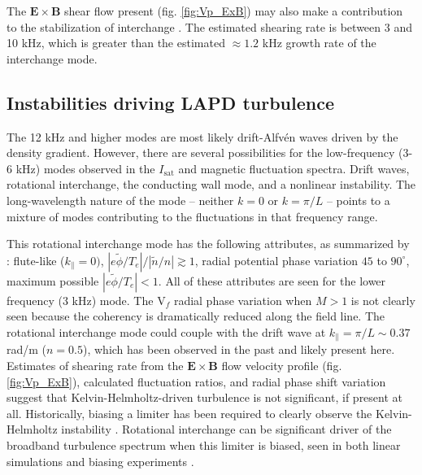 The $\boldsymbol{E \times B}$ shear flow present (fig. \ref{fig:Vp_ExB}) may also make a contribution to the stabilization of interchange \cite{Ryutov_2011,Bagryansky_2003,Bagryansky_2007,Beklemishev_2010}. The estimated shearing rate is between 3 and 10 kHz, which is greater than the estimated $\approx 1.2$ kHz growth rate of the interchange mode.

\subsection{Instabilities driving LAPD turbulence}


The 12 kHz and higher modes are most likely drift-Alfv\'en waves driven by the density gradient. However, there are several possibilities for the low-frequency (3-6 kHz) modes observed in the $I_\text{sat}$ and magnetic fluctuation spectra. Drift waves, rotational interchange, the conducting wall mode, and a nonlinear instability. The long-wavelength nature of the mode -- neither $k=0$ or $k=\pi/L$ -- points to a mixture of modes contributing to the fluctuations in that frequency range.

This rotational interchange mode has the following attributes, as summarized by \cite{Jassby_transverse_1972}: flute-like ($k_\parallel=0)$, $|e\tilde{\phi}/T_e|/|\tilde{n}/n| \gtrsim 1$, radial potential phase variation $45$ to $90^\circ$, maximum possible $|e\tilde{\phi}/T_e| < 1$. All of these attributes are seen for the lower frequency (3 kHz) mode. The V$_f$ radial phase variation when $M>1$ is not clearly seen because the coherency is dramatically reduced along the field line.
The rotational interchange mode could couple with the drift wave at $k_\parallel = \pi / L \sim 0.37$ rad/m ($n=0.5$), which has been observed in the past \cite{Schaffner_2013} and likely present here.
Estimates of shearing rate from the $\boldsymbol{E \times B}$ flow velocity profile (fig. \ref{fig:Vp_ExB}), calculated fluctuation ratios, and radial phase shift variation suggest that Kelvin-Helmholtz-driven turbulence is not significant, if present at all. Historically, biasing a limiter has been required to clearly observe the Kelvin-Helmholtz instability \cite{horton_vorticity_2005, Schaffner_2012, Schaffner_2013}. Rotational interchange can be significant driver of the broadband turbulence spectrum when this limiter is biased, seen in both linear simulations \cite{Popovich_2010} and biasing experiments \cite{Schaffner_2013}. 

